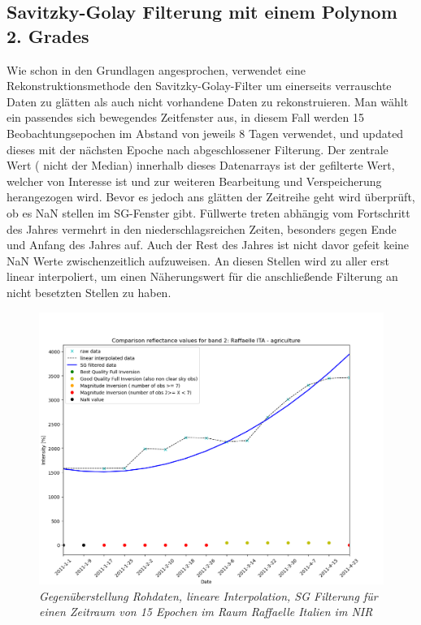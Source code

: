 \documentclass[11pt]{report}
\begin{document}
\subsection{Savitzky-Golay Filterung mit einem Polynom 2. Grades}
Wie schon in den Grundlagen angesprochen, verwendet eine Rekonstruktionsmethode den Savitzky-Golay-Filter um einerseits verrauschte Daten zu glätten als auch nicht vorhandene Daten zu rekonstruieren. Man wählt ein passendes sich bewegendes Zeitfenster aus, in diesem Fall werden 15 Beobachtungsepochen im Abstand von jeweils 8 Tagen verwendet, und updated dieses mit der nächsten Epoche nach abgeschlossener Filterung. Der zentrale Wert ( nicht der Median) innerhalb dieses Datenarrays ist der gefilterte Wert, welcher von Interesse ist und zur weiteren Bearbeitung und Verspeicherung herangezogen wird. Bevor es jedoch ans glätten der Zeitreihe geht wird überprüft, ob es NaN stellen im SG-Fenster gibt. Füllwerte treten abhängig vom Fortschritt des Jahres vermehrt in den niederschlagsreichen Zeiten, besonders gegen Ende und Anfang des Jahres auf. Auch der Rest des Jahres ist nicht davor gefeit keine NaN Werte zwischenzeitlich aufzuweisen. An diesen Stellen wird zu aller erst linear interpoliert, um einen Näherungswert für die anschließende Filterung an nicht besetzten Stellen zu haben. 
\begin{figure}[H]
\includegraphics[scale=0.6]{./Grafiken/Fitting/Fitting_method_comparison/comparison_reflectance_values_for_band_2_raffaella_it.png}
\caption{\textit{Gegenüberstellung Rohdaten, lineare Interpolation, SG Filterung für einen Zeitraum von 15 Epochen im Raum Raffaelle Italien im NIR}}
\label{fig:compare_fit_sg_raf_it_2011}
\end{figure}
\end{document}
